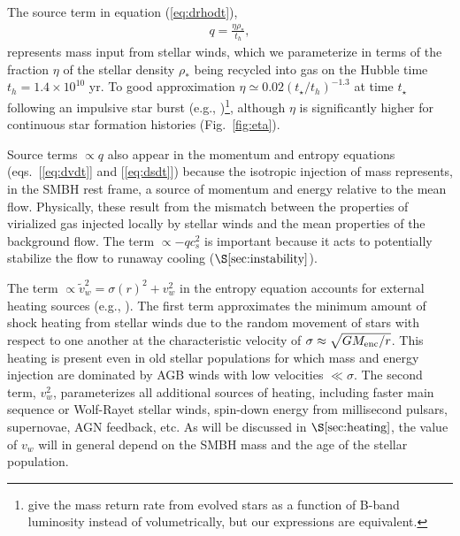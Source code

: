 \documentclass[usenatbib,fleqn]{mn2e}
\newcommand{\vw}{\tilde{v}_{w}}
\newcommand{\rhostar}{\rho_*}
\renewcommand{\th}{t_h}
\begin{document}
The source term in equation (\ref{eq:drhodt}),
\begin{align}
  q=\frac{\eta \rhostar}{\th},
\label{eq:q}
\end{align}
represents mass input from stellar winds, which we parameterize in
terms of the fraction $\eta$ of the stellar density $\rhostar$ being
recycled into gas on the Hubble time $\th = 1.4 \times 10^{10}$
yr.  To good approximation $\eta\simeq 0.02 (t_{\star}/t_h)^{-1.3}$ at time $t_{\star}$ following an impulsive star burst (e.g., \citealt{Ciotti+91})\footnote{\citet{Ciotti+91} give the mass return rate from evolved stars as a function of B-band luminosity instead of volumetrically, but our expressions are equivalent.}, although $\eta$ is significantly higher for continuous star formation histories (Fig.~\ref{fig:eta}).  

Source terms $\propto q$ also appear in the momentum and entropy
equations (eqs.~[\ref{eq:dvdt}] and [\ref{eq:dsdt}]) because the isotropic injection of mass represents, in the SMBH rest frame, a source of momentum
and energy relative to the mean flow.  Physically, these result from
the mismatch between the properties of virialized gas injected locally
by stellar winds and the mean properties of the background flow.  The
term $\propto -q c_{s}^{2}$ is important because it acts to potentially stabilize the flow to runaway cooling ($\S\ref{sec:instability}$).

The term $\propto \vw^2 = \sigma(r)^2+v_{w}^2$ in the entropy
equation accounts for external heating sources (e.g.,
\citealt{ShcherbakovWong+:2014a}).  The first term approximates the
minimum amount of shock heating from stellar winds due to the random movement
of stars with respect to one another at the characteristic velocity of $\sigma \approx \sqrt{GM_{\rm enc}/r}$.  This heating is present even in old stellar populations for which mass and energy injection are dominated by AGB winds with low velocities $\ll \sigma$.  The second term, $v_{w}^{2}$, parameterizes all additional sources of heating, including faster main
sequence or Wolf-Rayet stellar winds, spin-down energy from millisecond pulsars, supernovae, AGN
feedback, etc.  As will be discussed in $\S\ref{sec:heating}$, the value of
$v_{w}$ will in general depend on the SMBH mass and
the age of the stellar population.
\end{document}
